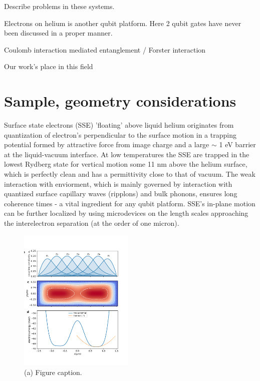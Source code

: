 \documentclass[%
 reprint,
 amsmath,amssymb,
 aps,
]{revtex4-2}
\begin{document}
Describe problems in these systems.

Electrons on helium is another qubit platform. Here 2 qubit gates have never been discussed in a proper manner.

Coulomb interaction mediated entanglement / Forster interaction

Our work's place in this field


\section{Sample, geometry considerations} %
Surface state electrons (SSE) 'floating' above liquid helium originates from quantization of electron's perpendicular to the surface motion in a trapping potential formed by attractive force from image charge and a large $\sim$ 1 eV barrier at the liquid-vacuum interface. At low temperatures the SSE are trapped in the lowest Rydberg state for vertical motion some 11 nm above the helium surface, which is perfectly clean and has a permittivity close to that of vacuum. The weak interaction with enviorment, which is mainly governed by interaction with quantized surface capillary waves (ripplons) and bulk phonons, ensures long coherence times - a vital ingredient for any qubit platform. SSE's in-plane motion can be further localized by using microdevices on the length scales approaching the interelectron separation (at the order of one micron). 

\begin{figure}
\includegraphics[width=0.49\textwidth]{Fig1.png}
\caption{\label{fig3} (a) Figure caption.}
\end{figure}
\end{document}
